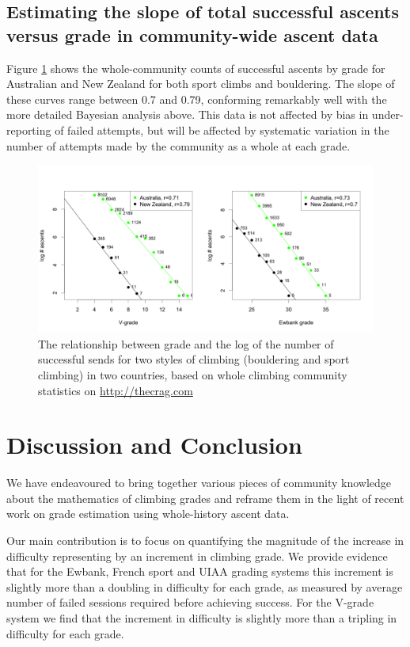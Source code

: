 \documentclass{article}
\begin{document}
{\subsection*{Estimating the slope of total successful ascents versus grade in community-wide ascent data}

Figure \ref{fig.oneill} shows the whole-community counts of successful ascents by grade for Australian and New Zealand for both sport climbs and bouldering. The slope of these curves range between 0.7 and 0.79, conforming remarkably well with the more detailed Bayesian analysis above. This data is not affected by bias in under-reporting of failed attempts, but will be affected by systematic variation in the number of attempts made by the community as a whole at each grade.

\begin{figure}
\centering
\includegraphics[width=\textwidth]{figure1.png}
\caption{\small The relationship between grade and the log of the number of successful sends for two styles of climbing (bouldering and sport climbing) in two countries, based on whole climbing community statistics on \url{http://thecrag.com}}
\label{fig.oneill}
\end{figure}

\section*{Discussion and Conclusion}

We have endeavoured to bring together various pieces of community knowledge about the mathematics of climbing grades and reframe them in the light of recent work on grade estimation using whole-history ascent data.

Our main contribution is to focus on quantifying the magnitude of the increase in difficulty representing by an increment in climbing grade. We provide evidence that for the Ewbank, French sport and UIAA grading systems this increment is slightly more than a doubling in difficulty for each grade, as measured by average number of failed sessions required before achieving success. For the V-grade system we find that the increment in difficulty is slightly more than a tripling in difficulty for each grade.

}
\end{document}
